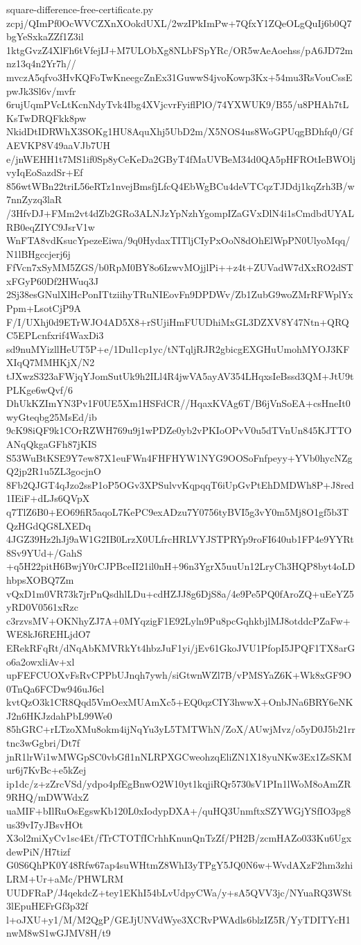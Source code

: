 \documentclass[11pt]{article}
\theoremstyle{definition}
\theoremstyle{remark}
\begin{document}
\begin{filecontents*}[overwrite]{square-difference-free-certificate.py}
zcpj/QImPf0OcWVCZXnXOokdUXL/2wzIPkImPw+7QfxY1ZQeOLgQuIj6b0Q7bgYeSxkaZZf1Z3il
1ktgGvzZ4XlFh6tVfejIJ+M7ULObXg8NLbFSpYRc/OR5wAeAoehss/pA6JD72mnz13q4n2Yr7h//
mvczA5qfvo3HvKQFoTwKneegcZnEx31GuwwS4jvoKowp3Kx+54mu3RsVouCssEpwJk3Sl6v/mvfr
6rujUqmPVcLtKcnNdyTvk4Ibg4XVjcvrFyiflPlO/74YXWUK9/B55/u8PHAh7tLKsTwDRQFkk8pw
NkidDtIDRWhX3SOKg1HU8AquXhj5UbD2m/X5NOS4us8WoGPUqgBDhfq0/GfAEVKP8V49aaVJb7UH
e/jnWEHH1t7MS1if0Sp8yCeKeDa2GByT4fMaUVBeM34d0QA5pHFROtIeBWOljvyIqEoSazdSr+Ef
856wtWBn22triL56eRTz1nvejBmsfjLfcQ4EbWgBCu4deVTCqzTJDdj1kqZrh3B/w7nnZyzq3laR
/3HfvDJ+FMm2vt4dZb2GRo3ALNJzYpNzhYgompIZaGVxDlN4i1sCmdbdUYALRB0eqZIYC9JsrV1w
WnFTA8vdKsucYpezeEiwa/9q0HydaxTITljCIyPxOoN8dOhElWpPN0UlyoMqq/N1lBHgccjerj6j
FfVcn7xSyMM5ZGS/b0RpM0BY8o6IzwvMOjjlPi++z4t+ZUVadW7dXxRO2dSTxFGyP60Df2HWuq3J
2Sj38esGNulXlHcPonITtziihyTRuNIEovFn9DPDWv/Zb1ZubG9woZMrRFWplYxPpm+LsotCjP9A
F/I/UXhj0d9ETrWJO4AD5X8+rSUjiHmFUUDhiMxGL3DZXV8Y47Ntn+QRQC5EPLcnfxrif4WaxDi3
sd9nuMYizllHeUT5P+e/1Dul1cp1yc/tNTqljRJR2gbicgEXGHuUmohMYOJ3KFXIqQ7MMHKjX/N2
tJXwzS323aFWjqYJomSutUk9h2ILl4R4jwVA5ayAV354LHqxsIeBssd3QM+JtU9tPLKge6wQvf/6
DhUkKZImYN3Pv1F0UE5Xm1HSFdCR//HqaxKVAg6T/B6jVnSoEA+csHneIt0wyGteqbg25MsEd/ib
9cK98iQF9k1COrRZWH769u9j1wPDZe0yb2vPKIoOPvV0u5dTVnUn845KJTTOANqQkgaGFh87jKIS
S53WuBtKSE9Y7ew87X1euFWn4FHFHYW1NYG9OOSoFnfpeyy+YVb0hycNZgQ2jp2R1u5ZL3gocjnO
8Fb2QJGT4qJzo2ssP1oP5OGv3XPSulvvKqpqqT6iUpGvPtEhDMDWh8P+J8red1IEiF+dLJs6QVpX
q7TlZ6B0+EO69fiR5aqoL7KePC9exADzu7Y0756tyBVI5g3vY0m5Mj8O1gf5b3TQzHGdQG8LXEDq
4JGZ39Hz2hJj9aW1G2IB0LrzX0ULfrcHRLVYJSTPRYp9roFI640ub1FP4e9YYRt8Sv9YUd+/GahS
+q5H22pitH6BwjY0rCJPBceII21il0nH+96n3YgrX5uuUn12LryCh3HQP8byt4oLDhbpsXOBQ7Zm
vQxD1m0VR73k7jrPnQsdhlLDu+cdHZJJ8g6DjS8a/4e9Pe5PQ0fAroZQ+uEeYZ5yRD0V0561xRzc
c3rzvsMV+OKNhyZJ7A+0MYqzigF1E92Lyln9Pu8pcGqhkbjlMJ8otddcPZaFw+WE8kJ6REHLjdO7
ERekRFqRt/dNqAbKMVRkYt4hbzJuF1yi/jEv61GkoJVU1PfopI5JPQF1TX8arGo6a2owxliAv+xl
upFEFCUOXvFsRvCPPbUJnqh7ywh/siGtwnWZl7B/vPMSYaZ6K+Wk8xGF9O0TnQa6FCDw946uJ6cl
kvtQzO3k1CR8Qqd5VmOexMUAmXc5+EQ0qzCIY3hwwX+OnbJNa6BRY6eNKJ2n6HKJzdahPbL99We0
85hGRC+rLTzoXMu8okm4ijNqYu3yL5TMTWhN/ZoX/AUwjMvz/o5yD0J5b21rrtnc3wGgbri/Dt7f
jnR1lrWi1wMWGpSC0vbGfl1nNLRPXGCweohzqEliZN1X18yuNKw3Ex1ZsSKMur6j7KvBc+e5kZej
ip1dc/z+zZrcVSd/ydpo4pfEgBnwO2W10yt1kqjiRQr5730sV1PIn1lWoM8oAmZR9RHQ/mDWWdxZ
uaMIF+bIlRuOsEgswKb120L0xIodypDXA+/quHQ3UnmftxSZYWGjYSfIO3pg8us39vI7yJBsvHOt
X3ol2miXyCv1sc4Et/fTrCTOTfICrhhKnunQnTzZf/PH2B/zcmHAZo033Ku6UgxdewPiN/H7tizf
G0S6QhPK0Y48Rfw67ap4suWHtmZ8WhI3yTPgY5JQ0N6w+WvdAXzF2hm3zhiLRM+Ur+aMc/PHWLRM
UUDFRaP/J4qekdcZ+tey1EKhI54bLvUdpyCWa/y+sA5QVV3jc/NYuaRQ3WSt3lEpuHEFrGf3p32f
l+oJXU+y1/M/M2QgP/GEJjUNVdWye3XCRvPWAdls6blzIZ5R/YyTDITYcH1nwM8wS1wGJMV8H/t9

\end{filecontents*}
\end{document}
